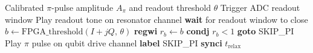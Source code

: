 \begin{algorithm}
\caption{Active qubit reset}
\label{alg:active_reset}
\begin{algorithmic}
\Require Calibrated $\pi$-pulse amplitude $A_\pi$ and readout threshold $\theta$
\State Trigger ADC readout window
\State Play readout tone on resonator channel
\State \textbf{wait} for readout window to close
\State $b \gets \text{FPGA\_threshold}(I + jQ,\, \theta)$
\State \textbf{regwi} $r_b \gets b$
\State \textbf{condj} $r_b < 1$ \textbf{goto} SKIP\_PI
\State Play $\pi$ pulse on qubit drive channel
\State \textbf{label} SKIP\_PI
\State \textbf{synci} $t_\text{relax}$
\end{algorithmic}
\end{algorithm}
